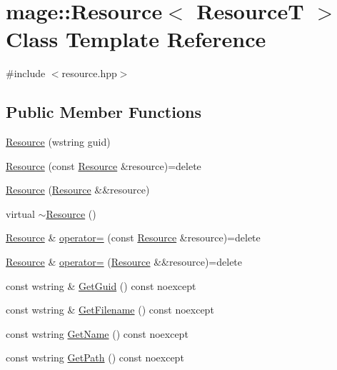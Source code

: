 \hypertarget{classmage_1_1_resource}{}\section{mage\+:\+:Resource$<$ ResourceT $>$ Class Template Reference}
\label{classmage_1_1_resource}


{\ttfamily \#include $<$resource.\+hpp$>$}

\subsection*{Public Member Functions}
\begin{DoxyCompactItemize}
\item 
\hyperlink{classmage_1_1_resource_aed55dc2f8700a2ba8123f3708948ed92}{Resource} (wstring guid)
\item 
\hyperlink{classmage_1_1_resource_a53da586d9bae285ab50c4cca2421a9ce}{Resource} (const \hyperlink{classmage_1_1_resource}{Resource} \&resource)=delete
\item 
\hyperlink{classmage_1_1_resource_a86216fd0f8072285ad1582e296a8a3fc}{Resource} (\hyperlink{classmage_1_1_resource}{Resource} \&\&resource)
\item 
virtual \hyperlink{classmage_1_1_resource_a56a3ac799224e100b271b65ec455b59e}{$\sim$\+Resource} ()
\item 
\hyperlink{classmage_1_1_resource}{Resource} \& \hyperlink{classmage_1_1_resource_a938159cb02ec565b9b957f993db4769d}{operator=} (const \hyperlink{classmage_1_1_resource}{Resource} \&resource)=delete
\item 
\hyperlink{classmage_1_1_resource}{Resource} \& \hyperlink{classmage_1_1_resource_aff0080e944136b1b0e889d4dd6cfb11f}{operator=} (\hyperlink{classmage_1_1_resource}{Resource} \&\&resource)=delete
\item 
const wstring \& \hyperlink{classmage_1_1_resource_adaa2464cb1fdb51a3f6028c0f316d083}{Get\+Guid} () const noexcept
\item 
const wstring \& \hyperlink{classmage_1_1_resource_a21bed60ba52a741eaffddc953f241be7}{Get\+Filename} () const noexcept
\item 
const wstring \hyperlink{classmage_1_1_resource_a7e056c97f70a3f7211d9456bbda51010}{Get\+Name} () const noexcept
\item 
const wstring \hyperlink{classmage_1_1_resource_a9df55cc00e0412b1435538e8107ee563}{Get\+Path} () const noexcept
\end{DoxyCompactItemize}
